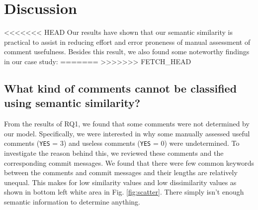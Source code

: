 \section{Discussion}
<<<<<<< HEAD
Our results have shown that our semantic similarity is practical to assist in reducing effort and error proneness of manual assessment of comment usefulness.  
Besides this result, we also found some noteworthy findings in our case study:
=======
>>>>>>> FETCH_HEAD


\subsection{What kind of comments cannot be classified using semantic similarity?}

From the results of RQ1, we found that some comments were not determined by our model.
Specifically, we were interested in why some manually assessed useful comments (\texttt{YES} = 3) and useless comments (\texttt{YES} = 0) were undetermined.
To investigate the reason behind this, we reviewed these comments and the corresponding commit messages.
We found that there were few common keywords between the comments and commit messages and their lengths are relatively unequal.
This makes for low similarity values and low dissimilarity values as shown in bottom left white area in Fig. \ref{fig:scatter}. There simply isn't enough semantic information to determine anything.




